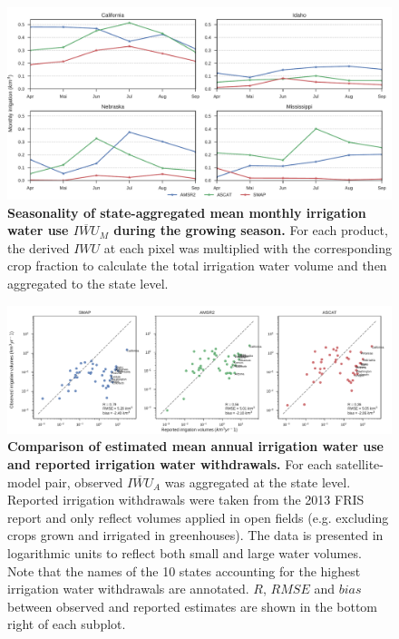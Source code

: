 \documentclass[hess, manuscript]{copernicus}
\begin{document}
\clearpage
\begin{figure}[t]
\includegraphics[width=\textwidth]{figures/validation/monthly_water_use_thresh_12}
\caption{\textbf{Seasonality of state-aggregated mean monthly irrigation water use $\overline{IWU}_{M}$ during the growing season.} For each product, the derived $IWU$ at each pixel was multiplied with the corresponding crop fraction to calculate the total irrigation water volume and then aggregated to the state level.}
\label{fig:volume-seasonality}
\end{figure}

\clearpage
\begin{figure}[t]
\includegraphics[width=\textwidth]{figures/validation/scatter_plot_states_thresh_12}
\caption{\textbf{Comparison of estimated mean annual irrigation water use and reported irrigation water withdrawals.} For each satellite-model pair, observed $\overline{IWU}_{A}$ was aggregated at the state level. Reported irrigation withdrawals were taken from the 2013 FRIS report and only reflect volumes applied in open fields (e.g. excluding crops grown and irrigated in greenhouses). The data is presented in logarithmic units to reflect both small and large water volumes. Note that the names of the 10 states accounting for the highest irrigation water withdrawals are annotated. $R$, $RMSE$ and $bias$ between observed and reported estimates are shown in the bottom right of each subplot.}
\label{fig:scatter-plot-volumes}
\end{figure}
\end{document}
